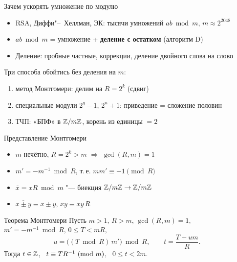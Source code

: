\documentclass{ca-slides}
\author{}
\begin{document}
\titleframe

\begin{canvasframe}{Зачем ускорять умножение по модулю}
  \small
  \begin{itemize}
    \item RSA, Диффи"--~Хеллман, ЭК: тысячи умножений $ab \bmod m$, $m \approx 2^{2048}$
    \item $ab \bmod m$ = умножение + \textbf{деление с остатком} (алгоритм D)
    \item Деление: пробные частные, коррекции, деление двойного слова на слово
  \end{itemize}
  \medskip
  Три способа обойтись без деления на $m$:
  \begin{enumerate}
    \item метод Монтгомери: делим на $R = 2^k$ (сдвиг)
    \item специальные модули $2^q - 1$, $2^n + 1$: приведение = сложение половин
    \item ТЧП: «БПФ» в $\mathbb{Z}/m\mathbb{Z}$, корень из единицы $= 2$
  \end{enumerate}
\end{canvasframe}

\begin{canvasframe}{Представление Монтгомери}
  \begin{itemize}
    \item $m$ нечётно, $R = 2^k > m$ $\Rightarrow$ $\gcd(R, m) = 1$
    \item $m' = -m^{-1} \bmod R$, \quad т.\,е. $m m' \equiv -1 \pmod R$
    \item $\bar x = xR \bmod m$ "--- биекция $\mathbb{Z}/m\mathbb{Z} \to \mathbb{Z}/m\mathbb{Z}$
    \item $\overline{x \pm y} \equiv \bar x \pm \bar y$, \quad
      $\bar x \bar y \equiv \overline{xy}\, R$
  \end{itemize}
\end{canvasframe}

\begin{theoremframe}{Теорема Монтгомери}
  Пусть $m > 1$, $R > m$, $\gcd(R, m) = 1$, $m' = -m^{-1} \bmod R$, $0 \le T < mR$,
  \[
    u = \bigl((T \bmod R)\, m'\bigr) \bmod R, \qquad t = \frac{T + um}{R}.
  \]
  Тогда $t \in \mathbb{Z}$, \ $t \equiv TR^{-1}\ (\mathrm{mod}\ m)$, \ $0 \le t < 2m$.
\end{theoremframe}
\end{document}
